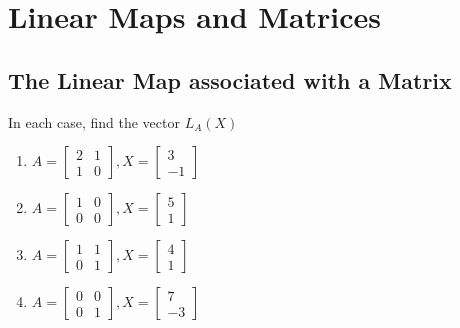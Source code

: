 \chapter{Linear Maps and Matrices}

\section{The Linear Map associated with a Matrix}
\setcounter{exercise}{0}

\begin{exercise}
    In each case, find the vector $L_{A}(X)$
    \begin{enumerate}[label={(\alph*)}]
        \item $A = \begin{bmatrix}2 & 1 \\ 1 & 0\end{bmatrix}, X = \begin{bmatrix}3 \\ -1\end{bmatrix}$
        \item $A = \begin{bmatrix}1 & 0 \\ 0 & 0\end{bmatrix}, X = \begin{bmatrix}5 \\ 1\end{bmatrix}$
        \item $A = \begin{bmatrix}1 & 1 \\ 0 & 1\end{bmatrix}, X = \begin{bmatrix}4 \\ 1\end{bmatrix}$
        \item $A = \begin{bmatrix}0 & 0 \\ 0 & 1\end{bmatrix}, X = \begin{bmatrix}7 \\ -3\end{bmatrix}$
    \end{enumerate}
\end{exercise}

